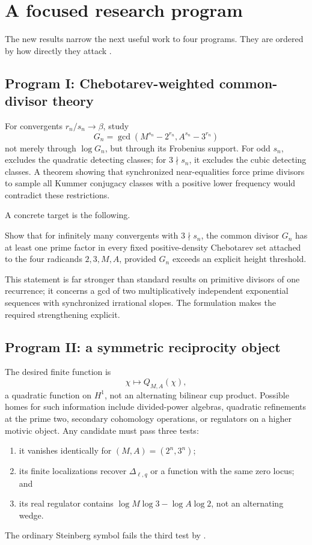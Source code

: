 \documentclass[11pt]{article}
\numberwithin{equation}{section}
\theoremstyle{definition}
\theoremstyle{remark}
\begin{document}
\section{A focused research program}
\label{sec:program}

The new results narrow the next useful work to four programs.  They are ordered by how
directly they attack .

\subsection{Program I: Chebotarev-weighted common-divisor theory}

For convergents \(r_n/s_n\to\beta\), study
\[
 G_n=\gcd(M^{s_n}-2^{r_n},A^{s_n}-3^{r_n})
\]
not merely through \(\log G_n\), but through its Frobenius support.  For odd \(s_n\),
 excludes the quadratic detecting classes; for \(3\nmid s_n\), it
excludes the cubic detecting classes.  A theorem showing that synchronized near-equalities
force prime divisors to sample all Kummer conjugacy classes with a positive lower frequency
would contradict these restrictions.

A concrete target is the following.

\begin{gapbox}
Show that for infinitely many convergents with \(3\nmid s_n\), the common divisor \(G_n\)
has at least one prime factor in every fixed positive-density Chebotarev set attached to the
four radicands \(2,3,M,A\), provided \(G_n\) exceeds an explicit height threshold.
\end{gapbox}

This statement is far stronger than standard results on primitive divisors of one recurrence;
it concerns a gcd of two multiplicatively independent exponential sequences with synchronized
irrational slopes.  The formulation makes the required strengthening explicit.

\subsection{Program II: a symmetric reciprocity object}

The desired finite function is
\[
 \chi\longmapsto Q_{M,A}(\chi),
\]
a quadratic function on \(H^1\), not an alternating bilinear cup product.  Possible homes for
such information include divided-power algebras, quadratic refinements at the prime two,
secondary cohomology operations, or regulators on a higher motivic object.  Any candidate
must pass three tests:
\begin{enumerate}
\item it vanishes identically for \((M,A)=(2^n,3^n)\);
\item its finite localizations recover \(\Delta_{\ell,q}\) or a function with the same zero
locus; and
\item its real regulator contains \(\log M\log3-\log A\log2\), not an alternating wedge.
\end{enumerate}
The ordinary Steinberg symbol fails the third test by .
\end{document}
